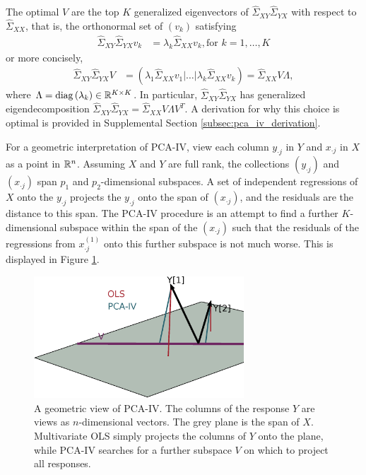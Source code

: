 \documentclass{article}
\begin{document}
The optimal $V$ are the top $K$ generalized eigenvectors of
$\hat{\Sigma}_{XY}\hat{\Sigma}_{YX}$ with respect to $\hat{\Sigma}_{XX}$, that
is, the orthonormal set of $\left(v_{k}\right)$ satisfying
\begin{align*}
  \hat{\Sigma}_{XY}\hat{\Sigma}_{YX}v_{k} &= \lambda_{k}
  \hat{\Sigma}_{XX}v_{k}, \text{for } k = 1, \dots, K
\end{align*}
or more concisely,
\begin{align*}
\hat{\Sigma}_{XY}\hat{\Sigma}_{YX}V &= \left( \lambda_{1}
  \hat{\Sigma}_{XX}v_{1} \vert \dots \vert
  \lambda_{k}\hat{\Sigma}_{XX}v_{k}\right) =
\hat{\Sigma}_{XX}V\Lambda,
\end{align*}
where $\Lambda = \mathop\mathrm{diag}\left(\lambda_{k}\right) \in \mathbb{R}^{K \times K}$. In
particular, $\hat{\Sigma}_{XY}\hat{\Sigma}_{YX}$ has generalized
eigendecomposition $\hat{\Sigma}_{XY}\hat{\Sigma}_{YX} = \hat{\Sigma}_{XX}
V\Lambda V^{T}$. A derivation for why this choice is optimal is provided in
Supplemental Section \ref{subsec:pca_iv_derivation}.

For a geometric interpretation of PCA-IV, view each column $y_{\cdot j}$ in $Y$
and $x_{\cdot j}$ in $X$ as a point in $\mathbb{R}^{n}$. Assuming $X$ and $Y$ are
full rank, the collections $\left(y_{ \cdot j}\right)$ and $\left(x_{\cdot
  j}\right)$ span $p_{1}$ and $p_{2}$-dimensional subspaces. A set of
independent regressions of $X$ onto the $y_{\cdot j}$ projects the $y_{\cdot j}$
onto the span of $\left(x_{\cdot j}\right)$, and the residuals are the distance
to this span. The PCA-IV procedure is an attempt to find a further
$K$-dimensional subspace within the span of the $\left(x_{\cdot j}\right)$ such
that the residuals of the regressions from $x_{\cdot j}^{(1)}$ onto this further
subspace is not much worse. This is displayed in Figure
\ref{fig:pca_iv_geometry}.

\begin{figure}
  \centering
  \includegraphics[width=0.7\textwidth]{figure/pca_iv/pca_iv_geometry}
  \caption{A geometric view of PCA-IV. The columns of the response $Y$ are views
    as $n$-dimensional vectors. The grey plane is the span of
    $X$. Multivariate OLS simply projects the columns of $Y$ onto the plane,
    while PCA-IV searches for a further subspace $V$ on which to project all
    responses. \label{fig:pca_iv_geometry} }
\end{figure}
\end{document}
